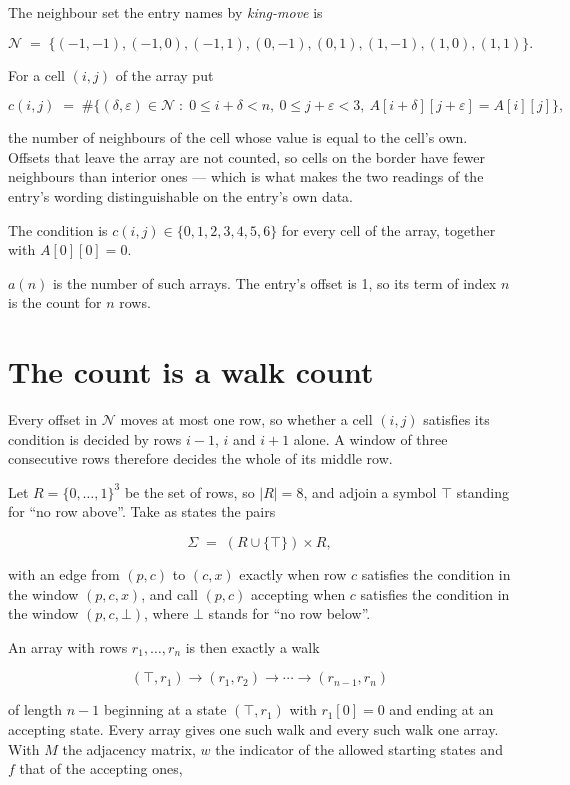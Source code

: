 \documentclass[11pt]{article}
\theoremstyle{definition}
\begin{document}
The neighbour set the entry names by {\itshape king-move} is

\[\mathcal{N} \;=\; \{(-1,-1), (-1,0), (-1,1), (0,-1), (0,1), (1,-1), (1,0), (1,1)\}.\]

For a cell $(i,j)$ of the array put

\[c(i,j) \;=\; \#\bigl\{(\delta,\varepsilon)\in\mathcal{N} \;:\; 0\le i+\delta<n,\ 0\le j+\varepsilon<3,\ A[i+\delta][j+\varepsilon] = A[i][j]\bigr\},\]

the number of neighbours of the cell whose value is equal to the cell's own. Offsets that leave the array are not counted, so cells on the border have fewer neighbours than interior ones --- which is what makes the two readings of the entry's wording distinguishable on the entry's own data.

The condition is $c(i,j) \in \{0, 1, 2, 3, 4, 5, 6\}$ for every cell of the array, together with $A[0][0]=0$.

$a(n)$ is the number of such arrays. The entry's offset is 1, so its term of index $n$ is the count for $n$ rows.

\section{The count is a walk count}

Every offset in $\mathcal{N}$ moves at most one row, so whether a cell $(i,j)$ satisfies its condition is decided by rows $i-1$, $i$ and $i+1$ alone. A window of three consecutive rows therefore decides the whole of its middle row.

Let $R = \{0,\dots,1\}^{3}$ be the set of rows, so $|R| = 8$, and adjoin a symbol $\top$ standing for ``no row above''. Take as states the pairs

\[\Sigma \;=\; (R \cup \{\top\}) \times R,\]

with an edge from $(p,c)$ to $(c,x)$ exactly when row $c$ satisfies the condition in the window $(p,c,x)$, and call $(p,c)$ accepting when $c$ satisfies the condition in the window $(p,c,\bot)$, where $\bot$ stands for ``no row below''.

An array with rows $r_1,\dots,r_n$ is then exactly a walk

\[(\top,r_1) \to (r_1,r_2) \to \cdots \to (r_{n-1},r_n)\]

of length $n-1$ beginning at a state $(\top,r_1)$ with $r_1[0]=0$ and ending at an accepting state. Every array gives one such walk and every such walk one array. With $M$ the adjacency matrix, $w$ the indicator of the allowed starting states and $f$ that of the accepting ones,
\end{document}
